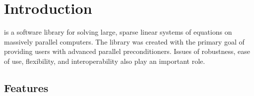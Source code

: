 

\chapter{Introduction}
\label{Introduction}

\hypre{} is a software library for solving large, sparse linear
systems of equations on massively parallel computers.  The library was
created with the primary goal of providing users with advanced
parallel preconditioners.  Issues of robustness, ease of use,
flexibility, and interoperability also play an important role.


\section{Features}
\label{Features}

